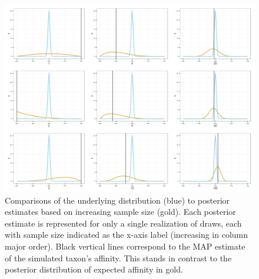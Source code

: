 \documentclass[12pt,letterpaper]{article}
\begin{document}
\begin{figure}[ht]
  \centering
  \includegraphics[height = \textheight,width=\textwidth,keepaspectratio=true]{figure/env_post_inspect}
  \caption{Comparisons of the underlying distribution (blue) to posterior estimates based on increasing sample size (gold). Each posterior estimate is represented for only a single realization of draws, each with sample size indicated as the x-axis label (increasing in column major order). Black vertical lines correspond to the MAP estimate of the simulated taxon's affinity. This stands in contrast to the posterior distribution of expected affinity in gold.}
  \label{fig:env_post}
\end{figure}
\end{document}
